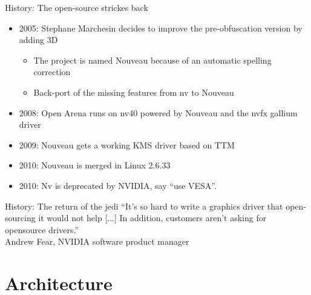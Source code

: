 \documentclass[11pt,english,compress]{beamer}
\begin{document}
	\begin{frame}
		\begin{block}{History: The open-source strickes back}
			\begin{itemize}
				\item 2005: Stephane Marchesin decides to improve the pre-obfuscation version by adding 3D
				\begin{itemize}
					\item The project is named Nouveau because of an automatic spelling correction
					\item Back-port of the missing features from nv to Nouveau
				\end{itemize}
				\item 2008: Open Arena runs on nv40 powered by Nouveau and the nvfx gallium driver
				\item 2009: Nouveau gets a working KMS driver based on TTM
				\item 2010: Nouveau is merged in Linux 2.6.33
				\item 2010: Nv is deprecated by NVIDIA, say ``use VESA''.
			\end{itemize}
		\end{block}
	\end{frame}

	\begin{frame}
		\begin{block}{History: The return of the jedi}
			``It's so hard to write a graphics driver that open-sourcing it
			would not help [...] In addition, customers aren't asking for opensource drivers.''\\
			Andrew Fear, NVIDIA software product manager
		\end{block}
	\end{frame}

\section{Architecture}
\end{document}
